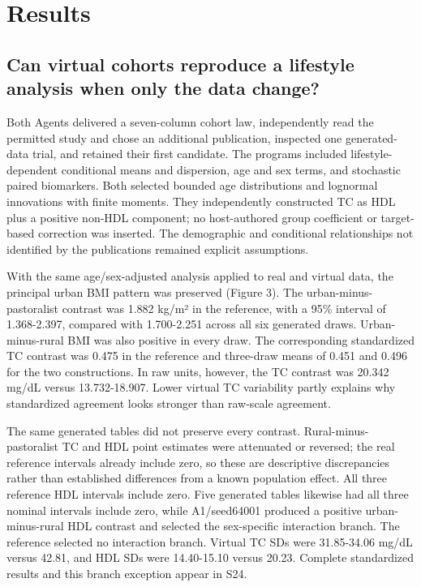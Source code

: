 \documentclass[11pt,letterpaper]{article}
\begin{document}

\section{Results}

\subsection{Can virtual cohorts reproduce a lifestyle analysis when only the data change?}

Both Agents delivered a seven-column cohort law, independently read the permitted study and chose an additional publication, inspected one generated-data trial, and retained their first candidate. The programs included lifestyle-dependent conditional means and dispersion, age and sex terms, and stochastic paired biomarkers. Both selected bounded age distributions and lognormal innovations with finite moments. They independently constructed TC as HDL plus a positive non-HDL component; no host-authored group coefficient or target-based correction was inserted. The demographic and conditional relationships not identified by the publications remained explicit assumptions.


With the same age/\allowbreak{}sex-adjusted analysis applied to real and virtual data, the principal urban BMI pattern was preserved (Figure 3). The urban-minus-pastoralist contrast was 1.882 kg/\allowbreak{}m² in the reference, with a 95\% interval of 1.368-2.397, compared with 1.700-2.251 across all six generated draws. Urban-minus-rural BMI was also positive in every draw. The corresponding standardized TC contrast was 0.475 in the reference and three-draw means of 0.451 and 0.496 for the two constructions. In raw units, however, the TC contrast was 20.342 mg/\allowbreak{}dL versus 13.732-18.907. Lower virtual TC variability partly explains why standardized agreement looks stronger than raw-scale agreement.


The same generated tables did not preserve every contrast. Rural-minus-pastoralist TC and HDL point estimates were attenuated or reversed; the real reference intervals already include zero, so these are descriptive discrepancies rather than established differences from a known population effect. All three reference HDL intervals include zero. Five generated tables likewise had all three nominal intervals include zero, while A1/\allowbreak{}seed64001 produced a positive urban-minus-rural HDL contrast and selected the sex-specific interaction branch. The reference selected no interaction branch. Virtual TC SDs were 31.85-34.06 mg/\allowbreak{}dL versus 42.81, and HDL SDs were 14.40-15.10 versus 20.23. Complete standardized results and this branch exception appear in S24.
\end{document}
